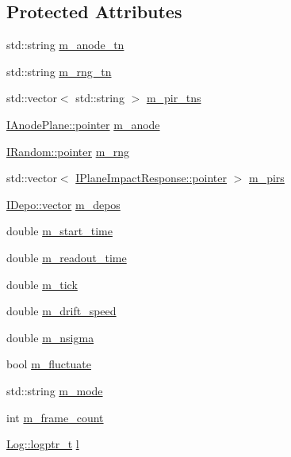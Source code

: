 \subsection*{Protected Attributes}
\begin{DoxyCompactItemize}
\item 
std\+::string \hyperlink{class_wire_cell_1_1_gen_1_1_ductor_a7382e604218bec981a02f471cc2507f6}{m\+\_\+anode\+\_\+tn}
\item 
std\+::string \hyperlink{class_wire_cell_1_1_gen_1_1_ductor_ab2718e86088d614e00b83f2755512ffb}{m\+\_\+rng\+\_\+tn}
\item 
std\+::vector$<$ std\+::string $>$ \hyperlink{class_wire_cell_1_1_gen_1_1_ductor_a37e02625a1dd89ab5e34ebd7adcfa0f7}{m\+\_\+pir\+\_\+tns}
\item 
\hyperlink{class_wire_cell_1_1_interface_a09c548fb8266cfa39afb2e74a4615c37}{I\+Anode\+Plane\+::pointer} \hyperlink{class_wire_cell_1_1_gen_1_1_ductor_a140f8f60e705ed486c631d8a90b606e3}{m\+\_\+anode}
\item 
\hyperlink{class_wire_cell_1_1_i_component_a744b962ee9489c909f1b0f1fe2533798}{I\+Random\+::pointer} \hyperlink{class_wire_cell_1_1_gen_1_1_ductor_a901669d8280fa96379c769f8e2ff19c8}{m\+\_\+rng}
\item 
std\+::vector$<$ \hyperlink{class_wire_cell_1_1_interface_a09c548fb8266cfa39afb2e74a4615c37}{I\+Plane\+Impact\+Response\+::pointer} $>$ \hyperlink{class_wire_cell_1_1_gen_1_1_ductor_a44d3cb27486f1a6dd7915dfdd66e9589}{m\+\_\+pirs}
\item 
\hyperlink{class_wire_cell_1_1_i_data_ae1a9f863380499bb43f39fabb6276660}{I\+Depo\+::vector} \hyperlink{class_wire_cell_1_1_gen_1_1_ductor_a0df2cd8150ece869d3712c2ffbab1e9d}{m\+\_\+depos}
\item 
double \hyperlink{class_wire_cell_1_1_gen_1_1_ductor_a66ab44d72d625317020972b051d5530a}{m\+\_\+start\+\_\+time}
\item 
double \hyperlink{class_wire_cell_1_1_gen_1_1_ductor_a7a08d05c0cd47649959a9f85734654bf}{m\+\_\+readout\+\_\+time}
\item 
double \hyperlink{class_wire_cell_1_1_gen_1_1_ductor_ab9a9d3d44a95f4a152afa44a78674c96}{m\+\_\+tick}
\item 
double \hyperlink{class_wire_cell_1_1_gen_1_1_ductor_af049caba394e694e67221904a9964f91}{m\+\_\+drift\+\_\+speed}
\item 
double \hyperlink{class_wire_cell_1_1_gen_1_1_ductor_a2003fb40fb5472e939225e994006bd2f}{m\+\_\+nsigma}
\item 
bool \hyperlink{class_wire_cell_1_1_gen_1_1_ductor_a767147f07f2e7a9525baed82237999af}{m\+\_\+fluctuate}
\item 
std\+::string \hyperlink{class_wire_cell_1_1_gen_1_1_ductor_a0ab7ec58f476694f4af3a6f6c7a84ed2}{m\+\_\+mode}
\item 
int \hyperlink{class_wire_cell_1_1_gen_1_1_ductor_ac8577d4c920065ece727d1fc170a4067}{m\+\_\+frame\+\_\+count}
\item 
\hyperlink{namespace_wire_cell_1_1_log_a5147137d4bcdf4d35c235c5c1ec1495f}{Log\+::logptr\+\_\+t} \hyperlink{class_wire_cell_1_1_gen_1_1_ductor_a7c7a41733999959445c78c4f72b17687}{l}
\end{DoxyCompactItemize}
